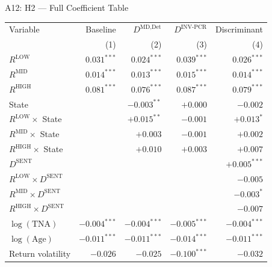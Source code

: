 \documentclass[10pt, aspectratio=169]{beamer}
\begin{document}

\begin{frame}{A12: H2 — Full Coefficient Table}
  \scriptsize
  \setlength{\tabcolsep}{4pt}
  \begin{tabular}{@{}lrrrr@{}}
    \toprule
    Variable & Baseline & $D^{\text{MD,Det}}$ & $D^{\text{INV-PCR}}$ & Discriminant \\
    & (1) & (2) & (3) & (4) \\
    \midrule
    $R^{\text{LOW}}$                     & $0.031^{***}$ & $0.024^{***}$ & $0.039^{***}$ & $0.026^{***}$ \\
    $R^{\text{MID}}$                     & $0.014^{***}$ & $0.013^{***}$ & $0.015^{***}$ & $0.014^{***}$ \\
    $R^{\text{HIGH}}$                    & $0.081^{***}$ & $0.076^{***}$ & $0.087^{***}$ & $0.079^{***}$ \\
    State                                &               & $-0.003^{**}$ & $+0.000$      & $-0.002$ \\
    $R^{\text{LOW}}\times$ State         &               & $+0.015^{**}$ & $-0.001$      & $+0.013^{*}$ \\
    $R^{\text{MID}}\times$ State         &               & $+0.003$      & $-0.001$      & $+0.002$ \\
    $R^{\text{HIGH}}\times$ State        &               & $+0.010$      & $+0.003$      & $+0.007$ \\
    $D^{\text{SENT}}$                    &               &               &               & $+0.005^{***}$ \\
    $R^{\text{LOW}}\times D^{\text{SENT}}$&              &               &               & $-0.005$ \\
    $R^{\text{MID}}\times D^{\text{SENT}}$&              &               &               & $-0.003^{*}$ \\
    $R^{\text{HIGH}}\times D^{\text{SENT}}$&             &               &               & $-0.007$ \\
    $\log(\text{TNA})$                   & $-0.004^{***}$& $-0.004^{***}$& $-0.005^{***}$& $-0.004^{***}$ \\
    $\log(\text{Age})$                   & $-0.011^{***}$& $-0.011^{***}$& $-0.014^{***}$& $-0.011^{***}$ \\
    Return volatility                    & $-0.026$      & $-0.025$      & $-0.100^{***}$& $-0.032$ \\

\end{tabular}
\end{frame}
\end{document}
